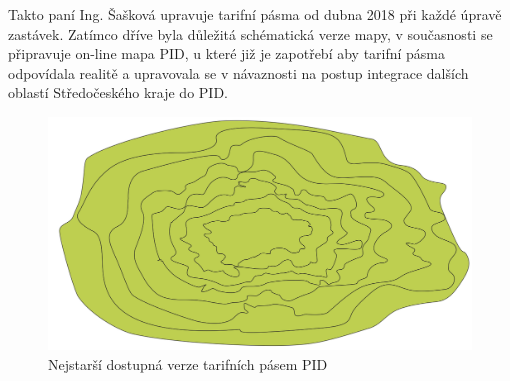 Takto paní Ing. Šašková upravuje tarifní pásma od dubna 2018 při každé úpravě zastávek. 
Zatímco dříve byla důležitá schématická verze mapy, v současnosti se připravuje on-line mapa PID, u které již je zapotřebí 
aby tarifní pásma odpovídala realitě a upravovala se v návaznosti na postup
integrace dalších oblastí Středočeského kraje do PID.

\begin{figure}[H] \centering
    \includegraphics[width=400pt]{./pictures/pasma-nejstarsi.png}
    \caption[Nejstarší dostupná verze tarifních pásem PID]{Nejstarší dostupná verze tarifních pásem PID \cite{pid}}
	\label{fig:pasma-schema}                                
\end{figure}


